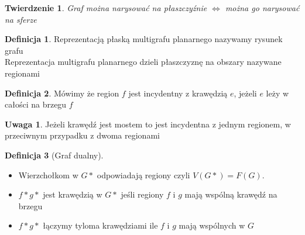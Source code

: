 \documentclass[12pt,a4paper]{article}
\newtheorem{tw}{Twierdzenie}
\theoremstyle{definition}
\newtheorem{df}{Definicja}
\newtheorem{uwaga}{Uwaga}
\begin{document}
\begin{tw}
Graf można narysować na płaszczyźnie $\Leftrightarrow$ można go narysować na sferze
\end{tw}

\begin{df}
Reprezentacją płaską multigrafu planarnego nazywamy rysunek grafu\\
Reprezentacja multigrafu planarnego dzieli płaszczyznę na obszary nazywane regionami
\end{df}

\begin{df}
Mówimy że region $f$ jest incydentny z krawędzią $e$, jeżeli $e$ leży w całości na brzegu $f$
\end{df}

\begin{uwaga}
Jeżeli krawędź jest mostem to jest incydentna z jednym regionem, w przeciwnym przypadku z dwoma regionami
\end{uwaga}

\begin{df}[Graf dualny]~\\
\begin{itemize}
	\item Wierzchołkom w $G*$ odpowiadają regiony czyli $V(G*) = F(G)$.
	\item $f*g*$ jest krawędzią w $G*$ jeśli regiony $f$ i $g$ mają wspólną krawędź na brzegu
	\item $f*g*$ łączymy tyloma krawędziami ile $f$ i $g$ mają wspólnych w $G$
\end{itemize}
\end{df}
\end{document}
